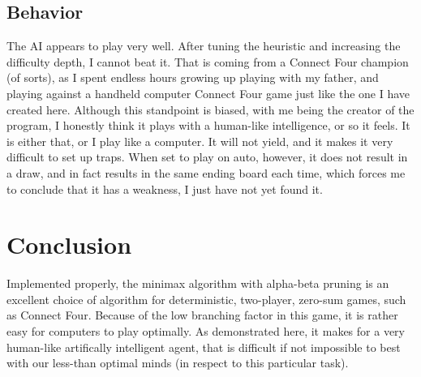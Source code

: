 \documentclass[12pt, article]{scrartcl}
\begin{document}
\subsection{Behavior}
The AI appears to play very well. After tuning the heuristic and increasing the difficulty depth, I cannot beat it. That is coming from a Connect Four champion (of sorts), as I spent endless hours growing up playing with my father, and playing against a handheld computer Connect Four game just like the one I have created here. Although this standpoint is biased, with me being the creator of the program, I honestly think it plays with a human-like intelligence, or so it feels. It is either that, or I play like a computer. It will not yield, and it makes it very difficult to set up traps. When set to play on auto, however, it does not result in a draw, and in fact results in the same ending board each time, which forces me to conclude that it has a weakness, I just have not yet found it.

\section{Conclusion}
Implemented properly, the minimax algorithm with alpha-beta pruning is an excellent choice of algorithm for deterministic, two-player, zero-sum games, such as Connect Four. Because of the low branching factor in this game, it is rather easy for computers to play optimally. As demonstrated here, it makes for a very human-like artifically intelligent agent, that is difficult if not impossible to best with our less-than optimal minds (in respect to this particular task).
\end{document}
